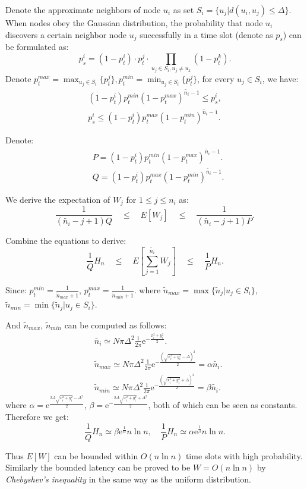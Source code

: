 \begin{IEEEproof}
Denote the approximate neighbors of node $u_i$ as set $S_i = \{u_j |
d(u_i, u_j) \leq \Delta \}$. When nodes obey the Gaussian distribution, the
probability that node $u_i$ discovers a certain neighbor node $u_{j}$
successfully in a time slot (denote as $p_{s}$) can be formulated as:
$$
p_{s}^i = (1-p_t^i) \cdot p_t^{j} \cdot \prod_{u_j \in S_i, u_j \neq u_k}(1-p_t^{k}).
$$
Denote $p_t^{max} = \max_{u_j \in S_i}\{p_t^{j}\}, p_t^{min} = \min_{u_j \in S_i}\{p_t^{j}\}$,
for every $u_j \in S_i$, we have:
\begin{equation*}
\begin{split}
(1-p_t^i)p_t^{min}{(1-p_t^{max})}^{\widetilde{n_i}-1} \leq p_{s}^i,  \\ %
p_{s}^i \leq (1-p_t^i)p_t^{max}{(1-p_t^{min})}^{\widetilde{n_i}-1}.
\end{split}
\end{equation*}

Denote: 
\begin{align*}
&P = (1-p_t^i)p_t^{min}{(1-p_t^{max})}^{\widetilde{n_i}-1}. \\
&Q = (1-p_t^i)p_t^{max}{(1-p_t^{min})}^{\widetilde{n_i}-1}.
\end{align*}

We derive the expectation of $W_j$ for $1 \leq j \leq n_i$ as:
$$
\frac{1}{(\widetilde{n_i}-j+1)Q} \quad \leq \quad E[W_j] \quad \leq \quad \frac{1}{(\widetilde{n_i}-j+1)P}.
$$

Combine the equations to derive:
$$
\frac{1}{Q}H_n  \quad \leq \quad E[\sum_{j=1}^{\widetilde{n_i}}W_j]  \quad \leq \quad \frac{1}{P}H_n.
$$

Since: $p_t^{min} = \frac{1}{\widetilde{n}_{max}+1}$, $p_t^{max} = \frac{1}{\widetilde{n}_{min}+1}.$
where $\widetilde{n}_{max} = \max\{\widetilde{n}_j | u_j\in S_i \}$, $\widetilde{n}_{min} = \min\{\widetilde{n}_j | u_j\in S_i \}$. 

And $\widetilde{n}_{max}$, $\widetilde{n}_{min}$ can be computed as follows:
\begin{align*}
&\widetilde{n_i} \simeq N\pi \Delta^2 \frac{1}{2\pi}\mathrm{e}^{-\frac{x_i^2+y_i^2}{2}}.							\\
&\widetilde{n}_{max}  \simeq N\pi \Delta^2 \frac{1}{2\pi}\mathrm{e}^{-\frac{{(\sqrt{x_i^2+y_i^2}-\Delta)}^2}{2}}  = \alpha\widetilde{n_i}.\\
&\widetilde{n}_{min}  \simeq N\pi \Delta^2 \frac{1}{2\pi}\mathrm{e}^{-\frac{{(\sqrt{x_i^2+y_i^2}+\Delta)}^2}{2}}  = \beta\widetilde{n_i}.
\end{align*}
where $\alpha = \mathrm{e}^{\frac{2\Delta\sqrt{x_i^2+y_i^2} - \Delta^2}{2}}$, 
$\beta = \mathrm{e}^{-\frac{2\Delta\sqrt{x_i^2+y_i^2} + \Delta^2}{2}}$, both of which can be seen as constants. Therefore we get:
$$
\frac{1}{Q}H_n \simeq \beta\mathrm{e}^{\frac{1}{\alpha}}n\ln n, \quad \frac{1}{P}H_n \simeq \alpha\mathrm{e}^{\frac{1}{\beta}}n\ln n. 
$$

Thus $E[W]$ can be bounded within $O(n\ln n)$ time slots with high probability.
Similarly the bounded latency can be proved to be $W=O(n\ln n)$ by \emph{Chebyshev's inequality} in the same way as
the uniform distribution.
\end{IEEEproof}
